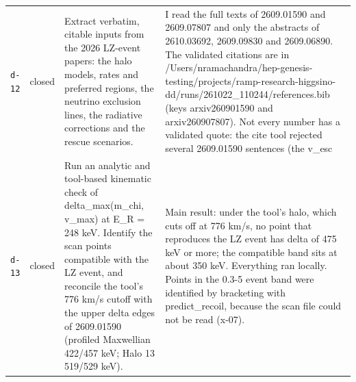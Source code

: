 \documentclass[11pt,a4paper]{article}
\begin{document}
\begin{longtable}{@{}p{}p{}p{}p{}@{}}
\texttt{d-12} & closed & Extract verbatim, citable inputs from the 2026 LZ-event papers: the halo models, rates and preferred regions, the neutrino exclusion lines, the radiative corrections and the rescue scenarios. & I read the full texts of 2609.01590 and 2609.07807 and only the abstracts of 2610.03692, 2609.09830 and 2609.06890. The validated citations are in /Users/nramachandra/hep-genesis-testing/projects/ramp-research-higgsino-dd/runs/261022\_110244/references.bib (keys arxiv260901590 and arxiv260907807). Not every number has a validated quote: the cite tool rejected several 2609.01590 sentences (the v\_esc \\
\texttt{d-13} & closed & Run an analytic and tool-based kinematic check of delta\_max(m\_chi, v\_max) at E\_R = 248 keV. Identify the scan points compatible with the LZ event, and reconcile the tool's 776 km/s cutoff with the upper delta edges of 2609.01590 (profiled Maxwellian 422/457 keV; Halo 13 519/529 keV). & Main result: under the tool's halo, which cuts off at 776 km/s, no point that reproduces the LZ event has delta of 475 keV or more; the compatible band sits at about 350 keV. Everything ran locally. Points in the 0.3-5 event band were identified by bracketing with predict\_recoil, because the scan file could not be read (x-07).


\end{longtable}
\end{document}
